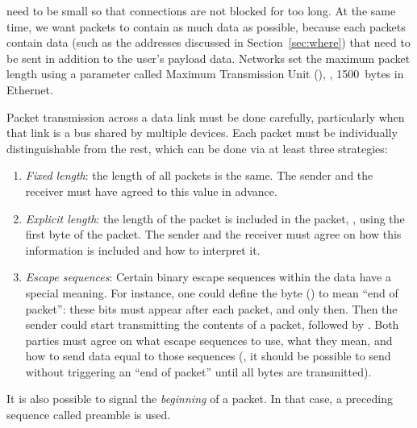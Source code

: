  need to be small so that connections are not blocked for too long. 
At the same time, we want packets to contain as much data as possible, because each packets 
contain  data (such as the addresses discussed in Section~\ref{sec:where}) that need
to be sent in addition to the user's payload data. Networks set the maximum packet length
using a parameter called Maximum Transmission Unit (), \eg, 1500~bytes in Ethernet.


Packet transmission across a data link must be done carefully,
particularly when that link is a bus shared by multiple devices.
Each packet must be individually distinguishable from the rest, 
which can be done via at least three strategies:
\begin{enumerate}
\item \textit{Fixed length}: the length of all packets is the same. The sender and the receiver must have
agreed to this value in advance.

\item \textit{Explicit length}: the length of the packet is included in the packet, \eg, 
using the first byte of the packet. The sender and the receiver must agree on how this information
is included and how to interpret it.

\item \textit{Escape sequences}: Certain binary escape sequences 
within the data have a special meaning. 
For instance, one could define the byte  () 
to mean ``end of packet'': these bits must appear after each packet, and only then.
% 
Then the sender could start transmitting the contents of a packet, followed by .
Both parties must agree on what escape sequences to use, what they mean, and how to 
send data equal to those sequences (\eg, it should be possible to send 
without triggering an ``end of packet'' until all bytes are transmitted).
\end{enumerate}

\begin{remark}
It is also possible to signal the \textit{beginning} of a packet. In that case, a preceding sequence called preamble is used.
\end{remark}


